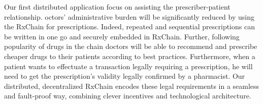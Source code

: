 Our first distributed application focus on assisting the prescriber-patient relationship.
octors’ administrative burden will be significantly reduced by using the RxChain for prescriptions.
Indeed, repeated and sequential prescriptions can be written in one go and securely embedded in RxChain.
Further, following popularity of drugs in the chain doctors will be able to recommend and prescribe cheaper
drugs to their patients according to best practices.
Furthermore, when a patient wants to effectuate a transaction legally requiring a prescription,
he will need to get the prescription’s validity legally confirmed by a pharmacist.
Our distributed, decentralized RxChain encodes these legal requirements in a seamless and fault-proof way,
combining clever incentives and technological architecture.
